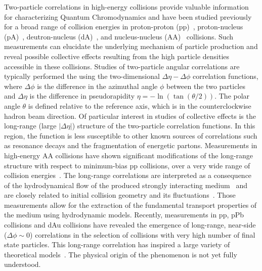 \documentclass[aps,prl,twocolumn,showpacs,superscriptaddress,groupedaddress]{revtex4}  %
\begin{document}
Two-particle correlations in high-energy collisions provide valuable information for characterizing Quantum Chromodynamics and have been studied previously for a broad range of collision energies in proton-proton (pp)~\cite{Khachatryan:2010gv,Aad:2015gqa}, proton-nucleus (pA)~\cite{CMS:2012qk,Abelev:2012ola,Aad:2012gla}, deutron-nucleus (dA)~\cite{Adare:2013piz}, and nucleus-nucleus (AA)~\cite{Aamodt:2010pa,Chatrchyan:2012wg} collisions. Such measurements can elucidate the underlying mechanism of particle production and reveal possible collective effects resulting from the high particle densities accessible in these collisions.
Studies of two-particle angular correlations are typically performed the using the two-dimensional $\Delta\eta-\Delta\phi$ correlation functions, where $\Delta\phi$ is the difference in the azimuthal angle $\phi$ between the two particles and $\Delta\eta$ is the difference in pseudorapidity $\eta = -\ln(\tan(\theta/2))$. The polar angle $\theta$ is defined relative to the reference axis, which is in the counterclockwise hadron beam direction. %
Of particular interest in studies of collective effects is the long-range (large $|\Delta\eta|$) structure of the two-particle correlation functions. In this region, the function is less susceptible to other known sources of correlations such as resonance decays and the fragmentation of energetic partons. Measurements in high-energy AA collisions have shown significant modifications of the long-range structure with respect to minimum-bias pp collisions, over a very wide range of collision energies~\cite{Back:2004je,Arsene:2004fa,Adcox:2004mh,Adams:2005dq}. The long-range correlations are interpreted as a consequence of the hydrodynamical flow of the produced strongly interacting medium~\cite{Ollitrault:1992bk} and are closely related to initial collision geometry and its fluctuations~\cite{Alver:2010gr}. Those measurements allow for the extraction of the fundamental transport properties of the medium using hydrodynamic models. %
Recently, measurements in pp, pPb collisions and dAu collisions have revealed the emergence of long-range, near-side ($\Delta\phi\sim 0$) correlations in the selection of collisions with very high number of final state particles. This long-range correlation has inspired a large variety of theoretical models~\cite{Bzdak:2013zma,Dusling:2015gta,He:2015hfa}. The physical origin of the phenomenon is not yet fully understood. 
\end{document}
